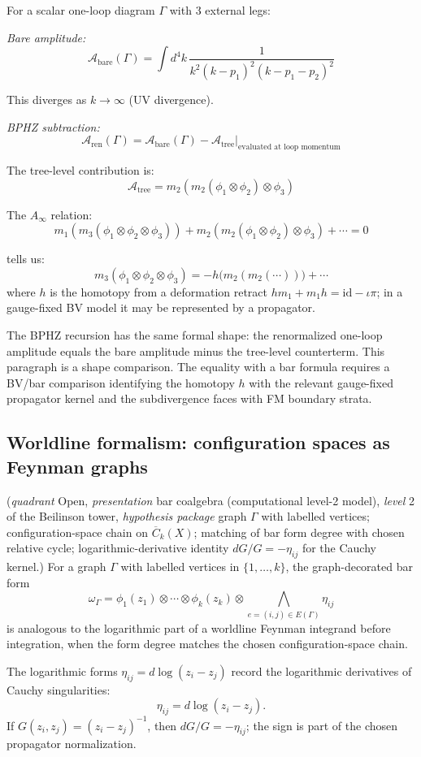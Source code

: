 \begin{example}
\label{ex:bphz-one-loop}
For a scalar one-loop diagram $\Gamma$ with 3 external legs:

\emph{Bare amplitude:}
\[\mathcal{A}_{\text{bare}}(\Gamma) = \int d^4k \,
\frac{1}{k^2(k-p_1)^2(k-p_1-p_2)^2}\]

This diverges as $k \to \infty$ (UV divergence).

\emph{BPHZ subtraction:}
\[\mathcal{A}_{\text{ren}}(\Gamma) = \mathcal{A}_{\text{bare}}(\Gamma) -
\mathcal{A}_{\text{tree}}|_{\text{evaluated at loop momentum}}\]

The tree-level contribution is:
\[\mathcal{A}_{\text{tree}} = m_2(m_2(\phi_1 \otimes \phi_2) \otimes \phi_3)\]

The $A_\infty$ relation:
\[m_1(m_3(\phi_1 \otimes \phi_2 \otimes \phi_3)) + m_2(m_2(\phi_1 \otimes \phi_2)
\otimes \phi_3) + \cdots = 0\]

tells us:
\[m_3(\phi_1 \otimes \phi_2 \otimes \phi_3) = -h\bigl(m_2(m_2(\cdots))\bigr) + \cdots\]
where $h$ is the homotopy from a deformation retract
$h m_1 + m_1 h = \mathrm{id} - \iota\pi$; in a gauge-fixed BV model it
may be represented by a propagator.

The BPHZ recursion has the same formal shape: the renormalized one-loop
amplitude equals the bare amplitude minus the tree-level counterterm.
This paragraph is a shape comparison.  The equality with a bar formula
requires a BV/bar comparison identifying the homotopy $h$ with the
relevant gauge-fixed propagator kernel and the subdivergence faces with
FM boundary strata.
\end{example}

\subsection{Worldline formalism: configuration spaces as Feynman graphs}

\begin{conjecture}
\label{conj:v1-bar-worldline}
\textup{(}\emph{quadrant} Open, \emph{presentation} bar coalgebra
\textup{(}computational level-2 model\textup{)},
\emph{level} 2 of the Beilinson tower,
\emph{hypothesis package} graph $\Gamma$ with labelled vertices;
configuration-space chain on $\overline{C}_k(X)$; matching of bar form
degree with chosen relative cycle; logarithmic-derivative identity
$dG/G = -\eta_{ij}$ for the Cauchy kernel.\textup{)}
For a graph $\Gamma$ with labelled vertices in
$\{1,\ldots,k\}$, the graph-decorated bar form
\[
\omega_\Gamma =
\phi_1(z_1) \otimes \cdots \otimes \phi_k(z_k)
\otimes \bigwedge_{e=(i,j)\in E(\Gamma)}\eta_{ij}
\]
is analogous to the logarithmic part of a worldline Feynman integrand
before integration, when the form degree matches the chosen
configuration-space chain.

The logarithmic forms $\eta_{ij} = d\log(z_i - z_j)$ record the
logarithmic derivatives of Cauchy singularities:
\[
\eta_{ij} = d\log(z_i-z_j).
\]
If $G(z_i,z_j)=(z_i-z_j)^{-1}$, then $dG/G=-\eta_{ij}$; the sign is
part of the chosen propagator normalization.
\end{conjecture}

